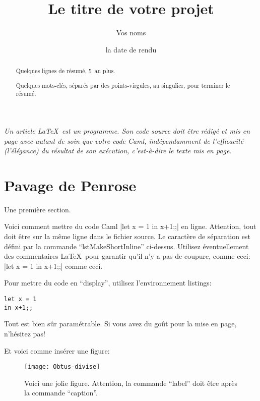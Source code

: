 \documentclass[a4paper,11pt]{article}%
\newenvironment{keywords}%
{\description\item[Mots-clés.]}%
{\enddescription}
\newcommand{\dbend}{{\manual\char127}}
\newenvironment{attention}%
{\description\item[\dbend]\sl}%
{\enddescription}
\begin{document}
\title{Le titre de votre projet}

\author{Vos noms}

\date{la date de rendu}

\maketitle

\begin{abstract}
  Quelques lignes de résumé, 5~au plus.
\begin{keywords}
 Quelques mots-clés, séparés par des points-virgules, au singulier,
 pour terminer le résumé.
\end{keywords}
\end{abstract}

\begin{attention}
  Un article \LaTeX\ est un programme. Son code \emph{source} doit être
  rédigé et mis en page avec autant de soin que votre code Caml,
  indépendamment de l'efficacité (l'élégance) du résultat de son
  exécution, c'est-à-dire le texte mis en page.
\end{attention}

\section{Pavage de Penrose}
\label{sec:Penrose}

Une première section.

Voici comment mettre du code Caml |let x = 1 in x+1;;| en
ligne. Attention, tout doit être sur la même ligne dans le fichier
source. Le caractère de séparation est défini par la commande
``lstMakeShortInline'' ci-dessus. Utilisez éventuellement des
commentaires \LaTeX\ pour garantir qu'il n'y a pas de coupure, comme ceci:
%
|let x = 1 in x+1;;|
%
comme ceci. 

Pour mettre du code en ``display'', utilisez l'environnement listings:
\begin{lstlisting}
let x = 1
in x+1;;
\end{lstlisting}
Tout est bien sûr paramétrable. Si vous avez du goût pour la mise en
page, n'hésitez pas!

Et voici comme insérer une figure:
\begin{figure}
  \centering
  \texttt{[image: Obtus-divise]}
  \caption{Voici une jolie figure. Attention, la commande ``label''
    doit être après la commande ``caption''.}
  \label{fig:example}
\end{figure}
\end{document}

